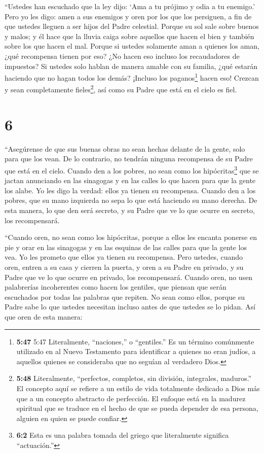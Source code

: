  ``Ustedes han escuchado que la ley dijo: `Ama a tu prójimo
y odia a tu enemigo.'  Pero yo les digo: amen a sus
enemigos y oren por los que los persiguen,  a fin de que
ustedes lleguen a ser hijos del Padre celestial. Porque su sol sale
sobre buenos y malos; y él hace que la lluvia caiga sobre aquellos que
hacen el bien y también sobre los que hacen el mal.  Porque
si ustedes solamente aman a quienes los aman, ¿qué recompensa tienen por
eso? ¿No hacen eso incluso los recaudadores de impuestos? 
Si ustedes solo hablan de manera amable con su familia, ¿qué estarán
haciendo que no hagan todos los demás? ¡Incluso los paganos\footnote{\textbf{5:47}
  5:47 Literalmente, ``naciones,'' o ``gentiles.'' Es un término
  comúnmente utilizado en al Nuevo Testamento para identificar a quienes
  no eran judíos, a aquellos quienes se consideraba que no seguían al
  verdadero Dios.} hacen eso!  Crezcan y sean completamente
fieles\footnote{\textbf{5:48} Literalmente, ``perfectos, completos, sin
  división, integrales, maduros.'' El concepto aquí se refiere a un
  estilo de vida totalmente dedicado a Dios más que a un concepto
  abstracto de perfección. El enfoque está en la madurez spiritual que
  se traduce en el hecho de que se pueda depender de esa persona,
  alguien en quien se puede confiar.}, así como su Padre que está en el
cielo es fiel.

\hypertarget{section-5}{%
\section{6}\label{section-5}}

 ``Asegúrense de que sus buenas obras no sean hechas delante
de la gente, solo para que los vean. De lo contrario, no tendrán ninguna
recompensa de su Padre que está en el cielo.  Cuando den a
los pobres, no sean como los hipócritas\footnote{\textbf{6:2} Esta es
  una palabra tomada del griego que literalmente significa
  ``actuación.''} que se jactan anunciando en las sinagogas y en las
calles lo que hacen para que la gente los alabe. Yo les digo la verdad:
ellos ya tienen su recompensa.  Cuando den a los pobres, que
su mano izquierda no sepa lo que está haciendo su mano derecha.
 De esta manera, lo que den será secreto, y su Padre que ve
lo que ocurre en secreto, los recompensará.

 ``Cuando oren, no sean como los hipócritas, porque a ellos
les encanta ponerse en pie y orar en las sinagogas y en las esquinas de
las calles para que la gente los vea. Yo les prometo que ellos ya tienen
su recompensa.  Pero ustedes, cuando oren, entren a su casa
y cierren la puerta, y oren a su Padre en privado, y su Padre que ve lo
que ocurre en privado, los recompensará.  Cuando oren, no
usen palabrerías incoherentes como hacen los gentiles, que piensan que
serán escuchados por todas las palabras que repiten.  No
sean como ellos, porque su Padre sabe lo que ustedes necesitan incluso
antes de que ustedes se lo pidan.  Así que oren de esta
manera:

